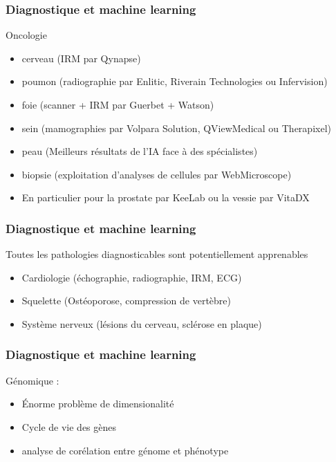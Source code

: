 \begin{frame}
  \frametitle{Diagnostique et machine learning}
  Oncologie
  \begin{itemize}
  \item cerveau (IRM par Qynapse)
  \item poumon (radiographie par Enlitic, Riverain Technologies ou Infervision)
  \item foie (scanner + IRM par Guerbet + Watson)
  \item sein (mamographies par Volpara Solution, QViewMedical ou Therapixel)
  \item peau (Meilleurs résultats de l'IA face à des spécialistes)
  \item biopsie (exploitation d'analyses de cellules par WebMicroscope)
  \item     En particulier pour la prostate par KeeLab ou la vessie par VitaDX
  \end{itemize}
\end{frame}

\begin{frame}
  \frametitle{Diagnostique et machine learning}
  Toutes les pathologies diagnosticables sont potentiellement apprenables
    \begin{itemize}
    \item Cardiologie (échographie, radiographie, IRM, ECG)
    \item Squelette (Ostéoporose, compression de vertèbre)
    \item Système nerveux (lésions du cerveau, sclérose en plaque)
    \end{itemize}
\end{frame}

\begin{frame}
  \frametitle{Diagnostique et machine learning}
  Génomique :
  \newline
  \begin{minipage}[c]{0.49\linewidth}
    \begin{itemize}
    \item Énorme problème de dimensionalité
    \item Cycle de vie des gènes
    \item analyse de corélation entre génome et phénotype
    \end{itemize}
  \end{minipage}\hfill
  \begin{minipage}[c]{0.49\linewidth}
  \end{minipage}\hfill
\end{frame}

